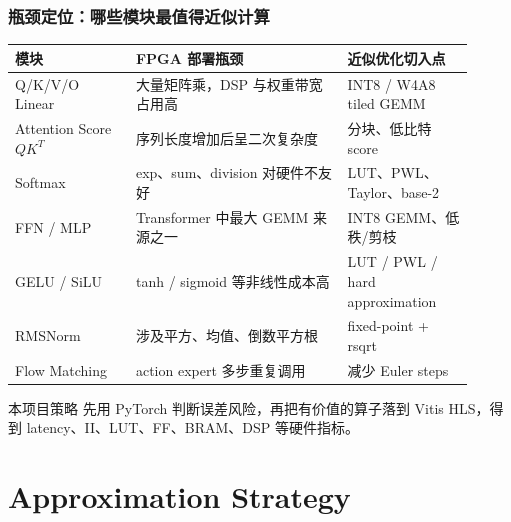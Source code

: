 \documentclass[10pt, aspectratio=169]{beamer}
\begin{document}
\begin{frame}
  \frametitle{瓶颈定位：哪些模块最值得近似计算}
  \footnotesize
  \begin{table}
    \setlength{\tabcolsep}{3pt}
    \begin{tabular}{@{}p{0.24\linewidth}p{0.42\linewidth}p{0.25\linewidth}@{}}
      \toprule
      模块                     & FPGA 部署瓶颈                  & 近似优化切入点               \\
      \midrule
      Q/K/V/O Linear           & 大量矩阵乘，DSP 与权重带宽占用高         & INT8 / W4A8 tiled GEMM \\
      Attention Score $QK^T$ & 序列长度增加后呈二次复杂度              & 分块、低比特 score        \\
      Softmax                & exp、sum、division 对硬件不友好    & LUT、PWL、Taylor、base-2 \\
      FFN / MLP              & Transformer 中最大 GEMM 来源之一 & INT8 GEMM、低秩/剪枝       \\
      GELU / SiLU            & tanh / sigmoid 等非线性成本高       & LUT / PWL / hard approximation \\
      RMSNorm                & 涉及平方、均值、倒数平方根            & fixed-point + rsqrt          \\
      Flow Matching           & action expert 多步重复调用        & 减少 Euler steps \\
      \bottomrule
    \end{tabular}
  \end{table}

  \vspace{3pt}
  \begin{alertblock}{本项目策略}
    先用 PyTorch 判断误差风险，再把有价值的算子落到 Vitis HLS，得到 latency、II、LUT、FF、BRAM、DSP 等硬件指标。
  \end{alertblock}
\end{frame}

\section{Approximation Strategy}
\end{document}
